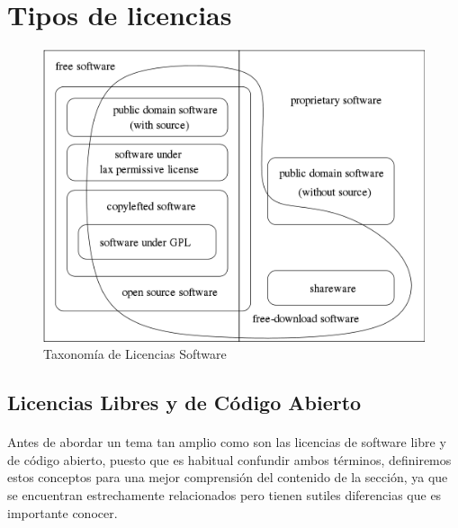 \documentclass[10pt]{article}
\begin{document}
    \newpage
    
    \section{Tipos de licencias}
    
        \begin{figure}[h]
        	\begin{center}
				\includegraphics[width=\textwidth]{license-categories}
          		\caption{Taxonomía de Licencias Software}
            \end{center}
        \end{figure}
        
        \paragraph{}
        
        
        \subsection{Licencias Libres y de Código Abierto}
        
			\paragraph{}
            Antes de abordar un tema tan amplio como son las licencias de software libre y de código abierto, puesto que es habitual confundir ambos términos, definiremos estos conceptos para una mejor comprensión del contenido de la sección, ya que se encuentran estrechamente relacionados pero tienen sutiles diferencias que es importante conocer.
            
\end{document}
